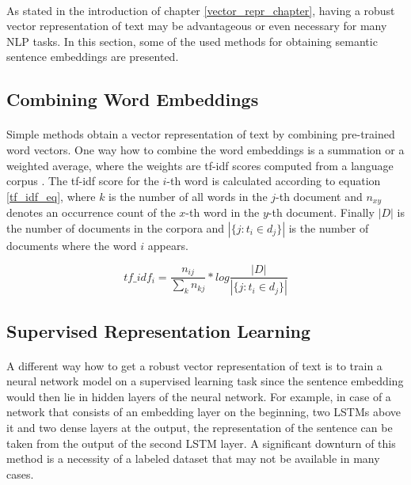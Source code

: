 \paragraph{}
As stated in the introduction of chapter \ref{vector_repr_chapter}, having a robust vector representation of text may be advantageous or even necessary for many NLP tasks. In this section, some of the used methods for obtaining semantic sentence embeddings are presented. 

\subsection{Combining Word Embeddings}\label{word_averaging}
\paragraph{}
Simple methods obtain a vector representation of text by combining pre-trained word vectors. One way how to combine the word embeddings is a summation or a weighted average, where the weights are tf-idf scores computed from a language corpus \cite{weighted_averaging_tfidf}. The tf-idf score for the $i$-th word is calculated according to equation \ref{tf_idf_eq}, where $k$ is the number of all words in the $j$-th document and $n_{xy}$ denotes an occurrence count of the $x$-th word in the $y$-th document. Finally $|D|$ is the number of documents in the corpora and  $|\{j:t_i \in d_j\}|$ is the number of documents where the word $i$ appears.

\begin{equation}
tf\_idf_i = \frac{n_{ij}}{\sum_{k}n_{kj}} * log \frac{|D|}{|\{j:t_i \in d_j\}|}
\label{tf_idf_eq}
\end{equation}  

\subsection{Supervised Representation Learning}\label{supervised_repre_learning}
\paragraph{}
A different way how to get a robust vector representation of text is to train a neural network model on a supervised learning task since the sentence embedding would then lie in hidden layers of the neural network. For example, in case of a network that consists of an embedding layer on the beginning, two LSTMs above it and two dense layers at the output, the representation of the sentence can be taken from the output of the second LSTM layer. A significant downturn of this method is a necessity of a labeled dataset that may not be available in many cases.


